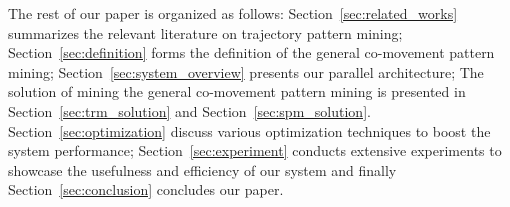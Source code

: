 The rest of our paper is organized as follows: Section~\ref{sec:related_works} summarizes the relevant literature on 
trajectory pattern mining; Section~\ref{sec:definition} forms the definition of the general co-movement pattern mining; Section~\ref{sec:system_overview} presents our parallel architecture; The solution of mining the general co-movement pattern mining is presented in Section~\ref{sec:trm_solution} and Section~\ref{sec:spm_solution}. Section~\ref{sec:optimization} discuss various optimization techniques to boost the system performance; Section~\ref{sec:experiment} conducts extensive experiments to showcase the usefulness and efficiency of our system and finally Section~\ref{sec:conclusion} concludes our paper.

